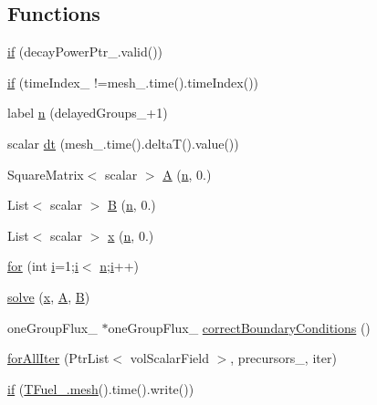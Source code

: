 \subsection*{Functions}
\begin{DoxyCompactItemize}
\item 
\hyperlink{solvePointKinetics_8H_a464c37d6b4cbb4baca050af45b49bddc}{if} (decay\+Power\+Ptr\+\_\+.\+valid())
\item 
\hyperlink{solvePointKinetics_8H_a5f7d3dd28e09080f8f663c61e98355b7}{if} (time\+Index\+\_\+ !=mesh\+\_\+.\+time().time\+Index())
\item 
label \hyperlink{solvePointKinetics_8H_adb283ac99a91b10be7420fca0134b932}{n} (delayed\+Groups\+\_\++1)
\item 
scalar \hyperlink{solvePointKinetics_8H_a5bbfd838dc83547e202d54a2d8578182}{dt} (mesh\+\_\+.\+time().deltaT().value())
\item 
Square\+Matrix$<$ scalar $>$ \hyperlink{solvePointKinetics_8H_af0b39a25157c5a983e067e9f3176f91f}{A} (\hyperlink{solvePointKinetics_8H_adb283ac99a91b10be7420fca0134b932}{n}, 0.)
\item 
List$<$ scalar $>$ \hyperlink{solvePointKinetics_8H_ad90d8ca8a73ab9419a1d3c42c66331cf}{B} (\hyperlink{solvePointKinetics_8H_adb283ac99a91b10be7420fca0134b932}{n}, 0.)
\item 
List$<$ scalar $>$ \hyperlink{solvePointKinetics_8H_a7155d56b187a002d8cdd92aa43066620}{x} (\hyperlink{solvePointKinetics_8H_adb283ac99a91b10be7420fca0134b932}{n}, 0.)
\item 
\hyperlink{solvePointKinetics_8H_ad699e831cc783494c5d29badc57dda3e}{for} (int \hyperlink{solvePointKinetics_8H_acb559820d9ca11295b4500f179ef6392}{i}=1;\hyperlink{solvePointKinetics_8H_acb559820d9ca11295b4500f179ef6392}{i}$<$ \hyperlink{solvePointKinetics_8H_adb283ac99a91b10be7420fca0134b932}{n};\hyperlink{solvePointKinetics_8H_acb559820d9ca11295b4500f179ef6392}{i}++)
\item 
\hyperlink{solvePointKinetics_8H_a19f87d5ecb68dc5b7a51d90136be39ed}{solve} (\hyperlink{solvePointKinetics_8H_a7155d56b187a002d8cdd92aa43066620}{x}, \hyperlink{solvePointKinetics_8H_af0b39a25157c5a983e067e9f3176f91f}{A}, \hyperlink{solvePointKinetics_8H_ad90d8ca8a73ab9419a1d3c42c66331cf}{B})
\item 
one\+Group\+Flux\+\_\+ $\ast$one\+Group\+Flux\+\_\+ \hyperlink{solvePointKinetics_8H_a51f09c6b4255c55b5c19b343624e1f52}{correct\+Boundary\+Conditions} ()
\item 
\hyperlink{solvePointKinetics_8H_a4ec71b601ad5a9cf0dc1eda90ba3c758}{for\+All\+Iter} (Ptr\+List$<$ vol\+Scalar\+Field $>$, precursors\+\_\+, iter)
\item 
\hyperlink{solvePointKinetics_8H_afe6c1942ab16dc0860f1b005d5913aeb}{if} (\hyperlink{createMeshesPostProcess_8H_a8bb1e58291d2d2b653e024a4f4bffe38}{T\+Fuel\+\_\+.\+mesh}().time().write())
\end{DoxyCompactItemize}
